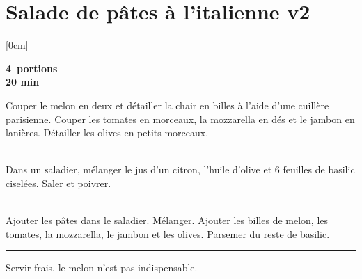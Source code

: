 \section{Salade de pâtes à l'italienne v2}		%

[0cm]

\begin{flushright}
	\textbf{4 portions} \\
	\textbf{20 min}
\end{flushright}

\vspace{.5cm}

\noindent
Couper le melon en deux et détailler la chair en billes à l'aide d'une cuillère parisienne. Couper les tomates en morceaux, la mozzarella en dés et le jambon en lanières. Détailler les olives en petits morceaux. \par
~\\
\noindent
Dans un saladier, mélanger le jus d'un citron, l'huile d'olive et 6 feuilles de basilic ciselées. Saler et poivrer.
\par ~\\
\noindent
Ajouter les pâtes dans le saladier. Mélanger. Ajouter les billes de melon, les tomates, la mozzarella, le jambon et les olives. Parsemer du reste de basilic.

\begin{center}
	\par\noindent\rule{.5\textwidth}{0.4pt} 
\end{center}

\noindent
Servir frais, le melon n'est pas indispensable.

\vspace{1cm}